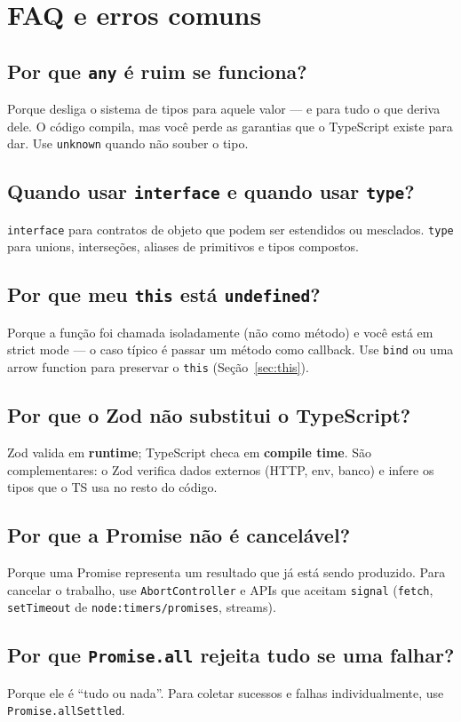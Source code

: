 \documentclass[12pt,a4paper,oneside]{book}
\newcommand{\code}[1]{\texttt{#1}}
\begin{document}
\chapter{FAQ e erros comuns}

\section*{Por que \texttt{any} é ruim se funciona?}
Porque desliga o sistema de tipos para aquele valor --- e para tudo o que deriva dele. O código compila, mas você perde as garantias que o TypeScript existe para dar. Use \code{unknown} quando não souber o tipo.

\section*{Quando usar \texttt{interface} e quando usar \texttt{type}?}
\code{interface} para contratos de objeto que podem ser estendidos ou mesclados. \code{type} para unions, interseções, aliases de primitivos e tipos compostos.

\section*{Por que meu \texttt{this} está \texttt{undefined}?}
Porque a função foi chamada isoladamente (não como método) e você está em strict mode --- o caso típico é passar um método como callback. Use \code{bind} ou uma arrow function para preservar o \code{this} (Seção~\ref{sec:this}).

\section*{Por que o Zod não substitui o TypeScript?}
Zod valida em \textbf{runtime}; TypeScript checa em \textbf{compile time}. São complementares: o Zod verifica dados externos (HTTP, env, banco) e infere os tipos que o TS usa no resto do código.

\section*{Por que a Promise não é cancelável?}
Porque uma Promise representa um resultado que já está sendo produzido. Para cancelar o trabalho, use \code{AbortController} e APIs que aceitam \code{signal} (\code{fetch}, \code{setTimeout} de \code{node:timers/promises}, streams).

\section*{Por que \texttt{Promise.all} rejeita tudo se uma falhar?}
Porque ele é ``tudo ou nada''. Para coletar sucessos e falhas individualmente, use \code{Promise.allSettled}.
\end{document}

